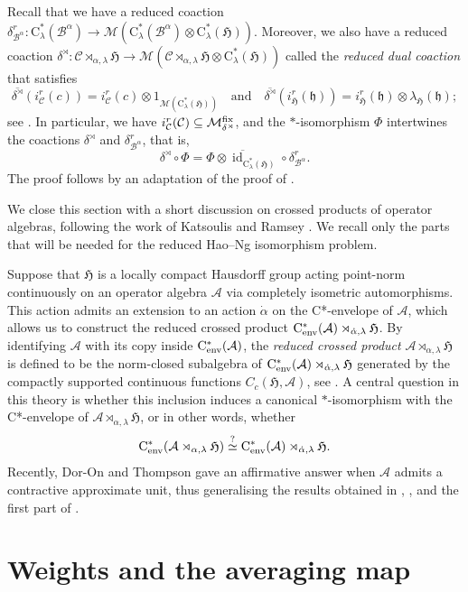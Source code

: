 \documentclass[11pt,final]{amsart}
\numberwithin{equation}{section}
\theoremstyle{plain}
\theoremstyle{definition}
\theoremstyle{remark}
\newcommand{\A}{{\mathcal{A}}}
\newcommand{\B}{{\mathcal{B}}}
\newcommand{\C}{{\mathcal{C}}}
\newcommand{\M}{{\mathcal{M}}}
\def\al{\alpha}
\def\de{\delta}
\def\la{\lambda}
\newcommand{\fH}{{\mathfrak{H}}}
\newcommand{\fh}{{\mathfrak{h}}}
\newcommand{\qand}{\quad\text{and}\quad}
\newcommand{\ca}{\mathrm{C}^*}
\newcommand{\cenv}{\mathrm{C}^*_{\textup{env}}}
\newcommand{\ol}{\overline}
\newcommand{\id}{{\operatorname{id}}}
\begin{document}
Recall that we have a reduced coaction $\de_{\B^\al}^r \colon \ca_\la(\B^\al) \to \M(\ca_\la(\B^\al) \otimes \ca_\la(\fH))$. Moreover, we also have a reduced coaction $\de^{\rtimes} \colon \C\rtimes_{\al,\la}\fH \to \M(\C\rtimes_{\al,\la}\fH \otimes \ca_\la(\fH))$ called the \emph{reduced dual coaction} that satisfies
\[
\ol{\de^\rtimes}(i_\C^r(c))= i_\C^r(c) \otimes 1_{\M(\ca_\la(\fH))} 
\qand 
\ol{\de^\rtimes}(i_\fH^r(\fh))= i_\fH^r(\fh) \otimes \la_\fH(\fh);
\]
see \cite[Pages 254--256]{Lan79}.
In particular, we have $i_\C^r(\C) \subseteq \M^{\rm fix}_{\de^{\rtimes}}$, and
the $*$-isomorphism $\Phi$ intertwines the coactions $\de^\rtimes$ and $\de_{\B^\al}^r$, that is, 
\[
\de^\rtimes \circ \Phi = \ol{\Phi \otimes \id_{\ca_\la(\fH)}} \circ \de_{\B^\al}^r.
\]
The proof follows by an adaptation of the proof of \cite[Proposition 3.5]{KMQW10}.

We close this section with a short discussion on crossed products of operator algebras, following the work of Katsoulis and Ramsey \cite{KR19}.
We recall only the parts that will be needed for the reduced Hao--Ng isomorphism problem.

Suppose that $\fH$ is a locally compact Hausdorff group acting point-norm continuously on an operator algebra $\A$ via completely isometric automorphisms.
This action admits an extension to an action $\dot{\al}$ on the C*-envelope of $\A$, which allows us to construct the reduced crossed product $\cenv(\A) \rtimes_{\dot\al, \la} \fH$.
By identifying $\A$ with its copy inside $\cenv(\A)$, the \emph{reduced crossed product} $\A \rtimes_{\al, \la} \fH$ is defined to be the norm-closed subalgebra of $\cenv(\A) \rtimes_{\dot{\al}, \la} \fH$ generated by the compactly supported continuous functions $C_c(\fH,\A)$, see \cite[Definition 3.17]{KR19}.
A central question in this theory is whether this inclusion induces a canonical $*$-isomorphism with the C*-envelope of $\A \rtimes_{\al, \la} \fH$, or in other words, whether
\begin{equation*}
\cenv(\A \rtimes_{\al, \la} \fH) \stackrel{?}{\simeq} \cenv(\A) \rtimes_{\dot\al, \la} \fH.
\end{equation*}
Recently, Dor-On and Thompson \cite[Theorem~4.4]{DT26} gave an affirmative answer when $\A$ admits a contractive approximate unit, thus generalising the results obtained in \cite[Theorem~2.5]{Kat17}, \cite[Theorem~3.23]{KR19}, and the first part of \cite[Theorem~3.6]{KR21}.

\section{Weights and the averaging map}
\end{document}
